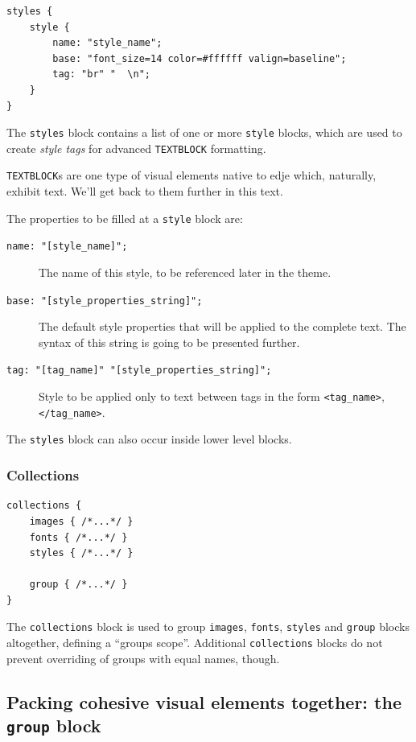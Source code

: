 \documentclass[a4paper]{profusion}
\begin{document}
\begin{lstlisting}
styles {
    style {
        name: "style_name";
        base: "font_size=14 color=#ffffff valign=baseline";
        tag: "br" "  \n";
    }
}
\end{lstlisting}

The  \texttt{styles} block  contains a  list of  one  or more
\texttt{style} blocks, which are used to create \emph{style tags} for
advanced \texttt{TEXTBLOCK} formatting.

\texttt{TEXTBLOCK}s are one type of visual elements native to edje
which, naturally, exhibit text. We'll get back to them further in this
text.

The properties to be filled at a \texttt{style} block are:
\begin{description}
\item[\texttt{name: "[style\_name]";}] The name of this style, to be
  referenced later in the theme.
\item[\texttt{base: "[style\_properties\_string]";}] The default style
  properties that will be applied to the complete text. The syntax of
  this string is going to be presented further.


\item[\texttt{tag: "[tag\_name]" "[style\_properties\_string]";}]
  Style to be applied only to text between tags in the form
  \texttt{<tag\_name>}, \texttt{</tag\_name>}.
\end{description}

The \texttt{styles} block can also occur inside lower level blocks.

\subsubsection{Collections}

\begin{lstlisting}
collections {
    images { /*...*/ }
    fonts { /*...*/ }
    styles { /*...*/ }

    group { /*...*/ }
}
\end{lstlisting}

The \texttt{collections} block is used to group \texttt{images},
\texttt{fonts}, \texttt{styles} and \texttt{group} blocks altogether,
defining a ``groups scope''. Additional \texttt{collections} blocks do
not prevent overriding of groups with equal names, though.

\subsection{Packing cohesive visual elements together: the \texttt{group}
 block}
\end{document}
